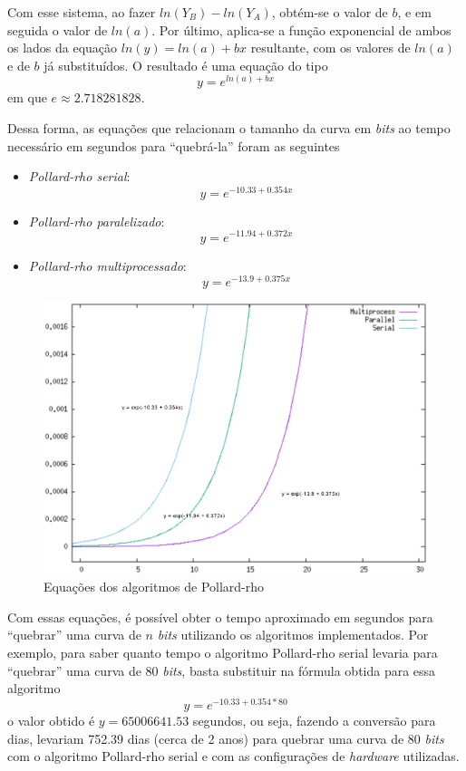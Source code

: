 Com esse sistema, ao fazer \(ln(Y_B) - ln(Y_A)\), obtém-se o valor de \(b\), e em seguida o valor de \(ln(a)\). Por último, aplica-se a função exponencial de ambos os lados da equação \(ln(y) = ln(a) + bx\) resultante, com os valores de \(ln(a)\) e de \(b\) já substituídos. O resultado é uma equação do tipo
\begin{equation*}
	y = e^{ln(a) + bx}
\end{equation*}
em que \(e \approx 2.718281828\).

Dessa forma, as equações que relacionam o tamanho da curva em \textit{bits} ao tempo necessário em segundos para ``quebrá-la'' foram as seguintes
\begin{itemize}
	\item \textit{Pollard-rho serial}: $$y = e^{-10.33 + 0.354x}$$
	\item \textit{Pollard-rho paralelizado}: $$y = e^{-11.94 + 0.372x}$$
	\item \textit{Pollard-rho multiprocessado}: $$y = e^{-13.9 + 0.375x}$$
\end{itemize}

\begin{figure}[h]
\centering
\includegraphics[scale=0.6, bb=0 0 515 478]{figuras/pollard_formulas.eps}
\caption{Equações dos algoritmos de Pollard-rho}
\label{eq_graph}
\end{figure}

Com essas equações, é possível obter o tempo aproximado em segundos para ``quebrar'' uma curva de \(n\) \textit{bits} utilizando os algoritmos implementados. Por exemplo, para saber quanto tempo o algoritmo Pollard-rho serial levaria para ``quebrar'' uma curva de 80 \textit{bits}, basta substituir na fórmula obtida para essa algoritmo
\begin{equation*}
	y = e^{-10.33 + 0.354*80}
\end{equation*}
o valor obtido é \(y = 65006641.53\) segundos, ou seja, fazendo a conversão para dias, levariam 752.39 dias (cerca de 2 anos) para quebrar uma curva de 80 \textit{bits} com o algoritmo Pollard-rho serial e com as configurações de \textit{hardware} utilizadas.

